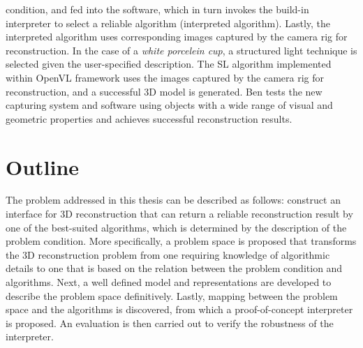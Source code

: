 condition, and fed into the software, which in turn invokes the build-in interpreter to select a reliable algorithm (interpreted algorithm). Lastly, the interpreted algorithm uses corresponding images captured by the camera rig for reconstruction. In the case of a \textit{white porcelein cup}, a structured light technique is selected given the user-specified description. The SL algorithm implemented within OpenVL framework uses the images captured by the camera rig for reconstruction, and a successful 3D model is generated. Ben tests the new capturing system and software using objects with a wide range of visual and geometric properties and achieves successful reconstruction results.





\section{Outline}
The problem addressed in this thesis can be described as follows: construct an interface for 3D reconstruction that can return a reliable reconstruction result by one of the best-suited algorithms, which is determined by the description of the problem condition. More specifically, a problem space is proposed that transforms the 3D reconstruction problem from one requiring knowledge of algorithmic details to one that is based on the relation between the problem condition and algorithms. Next, a well defined model and representations are developed to describe the problem space definitively. Lastly, mapping between the problem space and the algorithms is discovered, from which a proof-of-concept interpreter is proposed. An evaluation is then carried out to verify the robustness of the interpreter.

